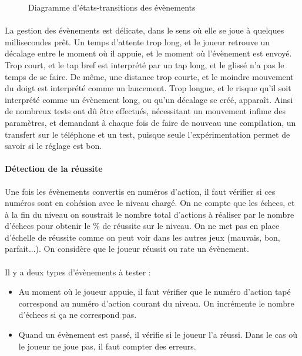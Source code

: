 \begin{figure}[!htb]\centering
  \caption{Diagramme d'états-transitions des évènements}
  \label{diagetattrans}
\end{figure}


\paragraph{}
La gestion des évènements est délicate, dans le sens où elle se joue à quelques millisecondes prêt. Un temps d'attente trop long, et le joueur retrouve un décalage entre le moment où il appuie, et le moment où l'évènement est envoyé. Trop court, et le tap bref est interprété par un tap long, et le glissé n'a pas le temps de se faire. De même, une distance trop courte, et le moindre mouvement du doigt est interprété comme un lancement. Trop longue, et le risque qu'il soit interprété comme un évènement long, ou qu'un décalage se créé, apparaît. Ainsi de nombreux tests ont dû être effectués, nécessitant un mouvement infime des paramètres, et demandant à chaque fois de faire de nouveau une compilation, un transfert sur le téléphone et un test, puisque seule l'expérimentation permet de savoir si le réglage est bon.

\paragraph{Détection de la réussite}
Une fois les évènements convertis en numéros d'action, il faut vérifier si ces numéros sont en cohésion avec le niveau chargé. On ne compte que les échecs, et à la fin du niveau on soustrait le nombre total d'actions à réaliser par le nombre d'échecs pour obtenir le \% de réussite sur le niveau.
On ne met pas en place d'échelle de réussite comme on peut voir dans les autres jeux (mauvais, bon, parfait...). On considère que le joueur réussit ou rate un évènement.\\\\
Il y a deux types d'évènements à tester :
\begin{itemize}
\item Au moment où le joueur appuie, il faut vérifier que le numéro d'action tapé correspond au numéro d'action courant du niveau. On incrémente le nombre d'échecs si ça ne correspond pas.
\item Quand un évènement est passé, il vérifie si le joueur l'a réussi. Dans le cas où le joueur ne joue pas, il faut compter des erreurs.
\end{itemize}
